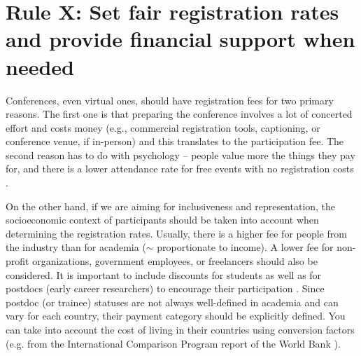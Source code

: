 \documentclass[10pt,letterpaper]{article}
\begin{document}


\section{Rule X: Set fair registration rates and provide financial support when needed}

Conferences, even virtual ones, should have registration fees for two primary reasons. The first one is that preparing the conference involves a lot of concerted effort and costs money (e.g., commercial registration tools, captioning, or conference venue, if in-person) and this translates to the participation fee. The second reason has to do with psychology -- people value more the things they pay for, and there is a lower attendance rate for free events with no registration costs \cite{eventbrite_ultimate_2017}. 

On the other hand, if we are aiming for inclusiveness and representation, the socioeconomic context of participants should be taken into account when determining the registration rates. Usually, there is a higher fee for people from the industry than for academia ($\sim$ proportionate to income). A lower fee for non-profit organizations, government employees, or freelancers should also be considered. It is important to include discounts for students as well as for postdocs (early career researchers) to encourage their participation \cite{sarabipour_evaluating_2020, andalib_postdoc_2018, kaplan_postdoc_2012}. Since postdoc (or trainee) statuses are not always well-defined in academia and can vary for each country, their payment category should be explicitly defined. You can take into account the cost of living in their countries using conversion factors (e.g. from the International Comparison Program report of the World Bank \cite{arend_disparity_2019}). 
\end{document}
